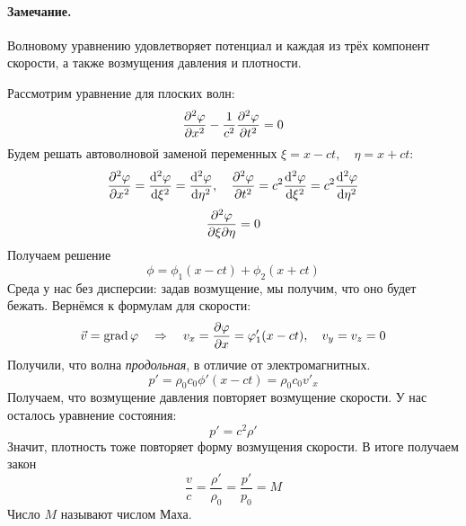 \paragraph{Замечание.} Волновому уравнению удовлетворяет потенциал
и каждая из трёх компонент скорости, а также возмущения давления и плотности.

Рассмотрим уравнение для плоских волн:
\begin{equation}
    \pdv[2]{\varphi}{x}-\frac{1}{c^2} \pdv[2]{\varphi}{t}=0
\end{equation}
Будем решать автоволновой заменой переменных $\xi = x-ct, \quad \eta=x+ct$:
\begin{equation}
    \pdv[2]{\varphi}{x} = \dv[2]{\varphi}{\xi} = \dv[2]{\varphi}{\eta}, \quad
    \pdv[2]{\varphi}{t} = c^2 \dv[2]{\varphi}{\xi}=
        c^2 \dv[2]{\varphi}{\eta}
\end{equation}
\begin{equation}
    \pdv[2]{\varphi}{\xi}{\eta}=0
\end{equation}
Получаем решение
\begin{equation}
    \phi = \phi_1(x-ct)+\phi_2(x+ct)
\end{equation}
Среда у нас без дисперсии: задав возмущение, мы получим, что оно будет бежать.
Вернёмся к формулам для скорости:
\begin{equation}
    \vec{v} = \operatorname{grad}\varphi 
    \quad\Rightarrow\quad 
    v_x = \pdv{\varphi}{x} = \varphi'_1(x-ct), \quad 
    v_y = v_z = 0
\end{equation}
Получили, что волна \textit{продольная}, в отличие от электромагнитных.
\begin{equation}
    p' = \rho_0 c_0 \phi' (x-ct) = \rho_{0} c_0 v'_x
\end{equation}
Получаем, что возмущение давления повторяет возмущение скорости. У нас 
осталось уравнение состояния:
\begin{equation}
    p' = c^2\rho'
\end{equation}
Значит, плотность  тоже повторяет форму возмущения скорости. В итоге получаем
закон
\begin{equation}
    \frac{v}{c} = \frac{\rho'}{\rho_0} = \frac{p'}{p_0}=M
\end{equation}
Число $M$ называют числом Маха.


